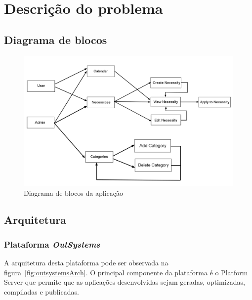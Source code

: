 \chapter{Descrição do problema}\label{chapter:description}

\section{Diagrama de blocos}\label{sec:diagram}

\begin{figure}[H]
  \centering
  \includegraphics[scale=0.4]{figures/Diagrama de blocos.png}
  \caption{Diagrama de blocos da aplicação}\label{fig:diagram}
\end{figure}

\newpage

\section{Arquitetura}\label{sec:arquitechture}

\subsection{Plataforma \textit{OutSystems}}

A arquitetura desta plataforma pode ser observada na figura~\ref{fig:outsystemsArch}. 
O principal componente da plataforma é o Platform Server que permite que as aplicações 
desenvolvidas sejam geradas, optimizadas, compiladas e publicadas. 

